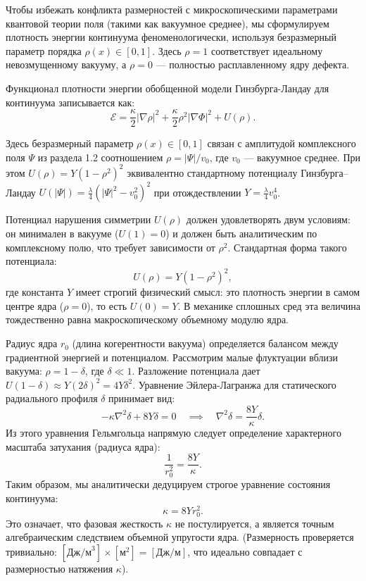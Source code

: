 \documentclass[11pt,a4paper]{article}
\begin{document}
Чтобы избежать конфликта размерностей с микроскопическими параметрами квантовой теории поля (такими как вакуумное среднее), мы сформулируем плотность энергии континуума феноменологически, используя безразмерный параметр порядка $\rho(x) \in [0, 1]$. Здесь $\rho = 1$ соответствует идеальному невозмущенному вакууму, а $\rho = 0$ — полностью расплавленному ядру дефекта.

Функционал плотности энергии обобщенной модели Гинзбурга-Ландау для континуума записывается как:
\begin{equation}
	\mathcal{E} = \frac{\kappa}{2} |\nabla \rho|^2 + \frac{\kappa}{2} \rho^2 |\nabla \Phi|^2 + U(\rho).
\end{equation}

Здесь безразмерный параметр $\rho(x) \in [0,1]$ связан с амплитудой комплексного поля $\Psi$ из раздела 1.2 соотношением $\rho = |\Psi|/v_0$, где $v_0$ — вакуумное среднее. При этом $U(\rho) = Y(1-\rho^2)^2$ эквивалентно стандартному потенциалу Гинзбурга–Ландау $U(|\Psi|) = \frac{\lambda}{4}(|\Psi|^2 - v_0^2)^2$ при отождествлении $Y = \frac{\lambda}{4}v_0^4$.

Потенциал нарушения симметрии $U(\rho)$ должен удовлетворять двум условиям: он минимален в вакууме ($U(1) = 0$) и должен быть аналитическим по комплексному полю, что требует зависимости от $\rho^2$. Стандартная форма такого потенциала:
\begin{equation}
	U(\rho) = Y (1 - \rho^2)^2,
\end{equation}
где константа $Y$ имеет строгий физический смысл: это плотность энергии в самом центре ядра ($\rho = 0$), то есть $U(0) = Y$. В механике сплошных сред эта величина тождественно равна макроскопическому объемному модулю ядра.

Радиус ядра $r_0$ (длина когерентности вакуума) определяется балансом между градиентной энергией и потенциалом. Рассмотрим малые флуктуации вблизи вакуума: $\rho = 1 - \delta$, где $\delta \ll 1$. Разложение потенциала дает $U(1-\delta) \approx Y(2\delta)^2 = 4Y\delta^2$. 
Уравнение Эйлера-Лагранжа для статического радиального профиля $\delta$ принимает вид:
\begin{equation}
	-\kappa \nabla^2 \delta + 8Y \delta = 0 \quad \implies \quad \nabla^2 \delta = \frac{8Y}{\kappa} \delta .
\end{equation}
Из этого уравнения Гельмгольца напрямую следует определение характерного масштаба затухания (радиуса ядра):
\begin{equation}
	\frac{1}{r_0^2} = \frac{8Y}{\kappa}.
\end{equation}
Таким образом, мы аналитически дедуцируем строгое уравнение состояния континуума:
\begin{equation}
	\kappa = 8 Y r_0^2.
\end{equation}
Это означает, что фазовая жесткость $\kappa$ не постулируется, а является точным алгебраическим следствием объемной упругости ядра. (Размерность проверяется тривиально: $[\text{Дж/м}^3] \times [\text{м}^2] = [\text{Дж/м}]$, что идеально совпадает с размерностью натяжения $\kappa$).
\end{document}

